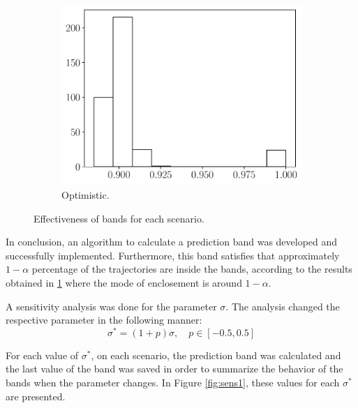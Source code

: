 \documentclass[11pt]{article}
\theoremstyle{definition}
\theoremstyle{remark}
\theoremstyle{remark}
\begin{document}
\begin{figure}[t]
\begin{subfigure}[b]{0.45\textwidth}
      \includegraphics[scale=0.45]{eff_opti.pdf}
      \caption{Optimistic.}
  \end{subfigure}
  \caption{Effectiveness of bands for each scenario.}
  \label{fig:eff1}
\end{figure}

In conclusion, an algorithm to calculate a prediction band was
developed and successfully implemented. Furthermore, this band satisfies that
approximately $1 - \alpha$ percentage of the
trajectories are inside the bands, according to the results obtained in
\ref{fig:eff1} where the mode of enclosement is around $1 - \alpha$.

A sensitivity analysis was done for the parameter $\sigma$. The
analysis changed the respective parameter in the following manner:
\begin{equation*}
  \sigma^* = (1 + p)\sigma, \quad p \in [-0.5, 0.5]
\end{equation*}

For each value of $\sigma^*$, on each scenario, the prediction band
was calculated and the last value of the band was saved in order to summarize
the behavior of the bands when the parameter changes. In Figure
\ref{fig:sens1}, these values for each $\sigma^*$ are presented.
\end{document}
